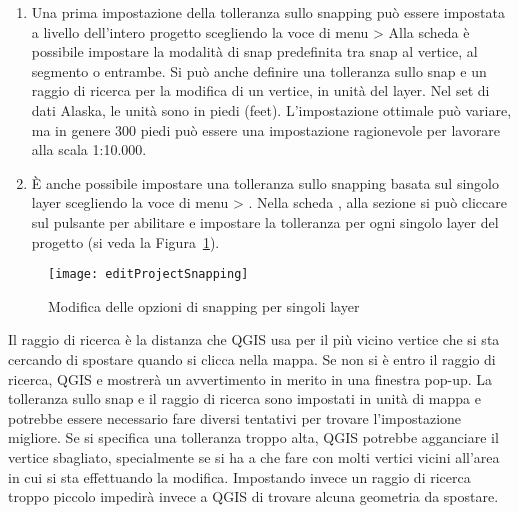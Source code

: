 \begin{enumerate}
\item Una prima impostazione della tolleranza sullo snapping può essere
impostata a livello dell'intero progetto scegliendo la voce di menu  > 
Alla scheda  è possibile impostare la modalità di
snap predefinita tra snap al vertice, al segmento o entrambe. Si può anche
definire una tolleranza sullo snap e un raggio di ricerca per la modifica di
un vertice, in unità del layer. Nel set di dati Alaska, le unità sono in piedi
(feet). L'impostazione ottimale può variare, ma in genere 300 piedi può essere
una impostazione ragionevole per lavorare alla scala 1:10.000.
\item È anche possibile impostare una tolleranza sullo snapping basata sul
singolo layer scegliendo la voce di menu  >
. Nella scheda
, alla sezione  si può cliccare sul
pulsante  per abilitare e impostare la tolleranza
per ogni singolo layer del progetto (si veda la Figura~\ref{fig:snappingoptions}).
\end{enumerate}

\begin{figure}[H]
   \begin{center}
   \caption{Modifica delle opzioni di snapping per singoli layer \nixcaption}\label{fig:snappingoptions}\smallskip
   \texttt{[image: editProjectSnapping]} 
\end{center}  
\end{figure}


Il raggio di ricerca è la distanza che QGIS usa per  il più
vicino vertice che si sta cercando di spostare quando si clicca nella mappa.
Se non si è entro il raggio di ricerca, QGIS e mostrerà un avvertimento in
merito in una finestra pop-up.
La tolleranza sullo snap e il raggio di ricerca sono impostati in unità di
mappa e potrebbe essere necessario fare diversi tentativi per trovare
l'impostazione migliore. Se si specifica una tolleranza troppo alta, QGIS
potrebbe agganciare il vertice sbagliato, specialmente se si ha a che fare con
molti vertici vicini all'area in cui si sta effettuando la modifica.
Impostando invece un raggio di ricerca troppo piccolo impedirà invece a QGIS
di trovare alcuna geometria da spostare.

